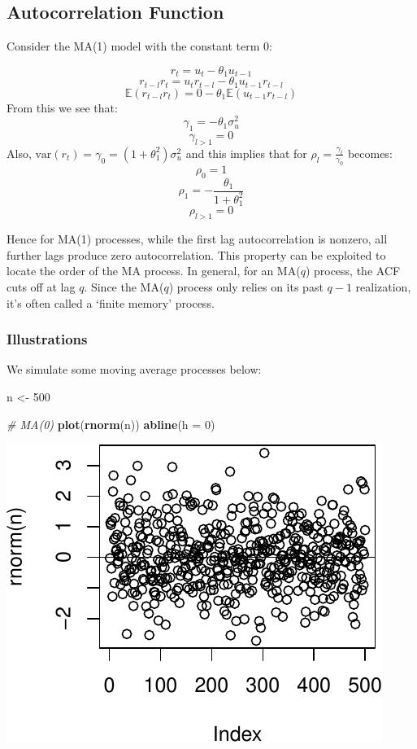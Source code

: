 \documentclass[11pt,]{article}
\newenvironment{Shaded}{\begin{snugshade}}{\end{snugshade}}
\newcommand{\KeywordTok}[1]{\textcolor[rgb]{0.13,0.29,0.53}{\textbf{#1}}}
\newcommand{\DataTypeTok}[1]{\textcolor[rgb]{0.13,0.29,0.53}{#1}}
\newcommand{\DecValTok}[1]{\textcolor[rgb]{0.00,0.00,0.81}{#1}}
\newcommand{\StringTok}[1]{\textcolor[rgb]{0.31,0.60,0.02}{#1}}
\newcommand{\CommentTok}[1]{\textcolor[rgb]{0.56,0.35,0.01}{\textit{#1}}}
\newcommand{\NormalTok}[1]{#1}
\begin{document}
\subsection{Autocorrelation Function}\label{autocorrelation-function}

Consider the MA(1) model with the constant term 0:

\[r_{t} = u_t -\theta_1u_{t-1}\]
\[r_{t-l}r_t = u_tr_{t-l} -\theta_1u_{t-1}r_{t-l}\]
\[\mathbb{E}(r_{t-l}r_t)=0-\theta_1\mathbb{E}(u_{t-1}r_{t-l})\] From
this we see that: \[\gamma_1=-\theta_1\sigma^2_u\] \[\gamma_{l>1}=0\]
Also, \(\text{var}(r_t) =\gamma_0= (1+\theta_1^2)\sigma_u^2\) and this
implies that for \(\rho_l = \frac{\gamma_l}{\gamma_0}\) becomes:
\[\rho_0 = 1\] \[\rho_1 = -\frac{\theta_1}{1+\theta_1^2}\]
\[\rho_{l>1} = 0\]

Hence for MA(1) processes, while the first lag autocorrelation is
nonzero, all further lags produce zero autocorrelation. This property
can be exploited to locate the order of the MA process. In general, for
an MA(\(q\)) process, the ACF cuts off at lag \(q\). Since the MA(\(q\))
process only relies on its past \(q-1\) realization, it's often called a
`finite memory' process.

\subsubsection{Illustrations}\label{illustrations}

We simulate some moving average processes below:

\begin{Shaded}
\begin{Highlighting}[]
\NormalTok{n <-}\StringTok{ }\DecValTok{500}

\CommentTok{# MA(0)}
\KeywordTok{plot}\NormalTok{(}\KeywordTok{rnorm}\NormalTok{(n))}
\KeywordTok{abline}\NormalTok{(}\DataTypeTok{h =} \DecValTok{0}\NormalTok{)}
\end{Highlighting}
\end{Shaded}

\begin{center}\includegraphics{FMC_T4_PhD_ARMA_GARCH_files/figure-latex/MA-1} \end{center}
\end{document}
